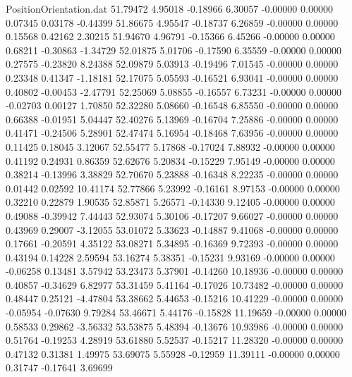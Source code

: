 \begin{filecontents}{PositionOrientation.dat}
  51.79472    4.95018   -0.18966     6.30057   -0.00000    0.00000    0.07345    0.03178   -0.44399
  51.86675    4.95547   -0.18737     6.26859   -0.00000    0.00000    0.15568    0.42162    2.30215
  51.94670    4.96791   -0.15366     6.45266   -0.00000    0.00000    0.68211   -0.30863   -1.34729
  52.01875    5.01706   -0.17590     6.35559   -0.00000    0.00000    0.27575   -0.23820    8.24388
  52.09879    5.03913   -0.19496     7.01545   -0.00000    0.00000    0.23348    0.41347   -1.18181
  52.17075    5.05593   -0.16521     6.93041   -0.00000    0.00000    0.40802   -0.00453   -2.47791
  52.25069    5.08855   -0.16557     6.73231   -0.00000    0.00000   -0.02703    0.00127    1.70850
  52.32280    5.08660   -0.16548     6.85550   -0.00000    0.00000    0.66388   -0.01951    5.04447
  52.40276    5.13969   -0.16704     7.25886   -0.00000    0.00000    0.41471   -0.24506    5.28901
  52.47474    5.16954   -0.18468     7.63956   -0.00000    0.00000    0.11425    0.18045    3.12067
  52.55477    5.17868   -0.17024     7.88932   -0.00000    0.00000    0.41192    0.24931    0.86359
  52.62676    5.20834   -0.15229     7.95149   -0.00000    0.00000    0.38214   -0.13996    3.38829
  52.70670    5.23888   -0.16348     8.22235   -0.00000    0.00000    0.01442    0.02592   10.41174
  52.77866    5.23992   -0.16161     8.97153   -0.00000    0.00000    0.32210    0.22879    1.90535
  52.85871    5.26571   -0.14330     9.12405   -0.00000    0.00000    0.49088   -0.39942    7.44443
  52.93074    5.30106   -0.17207     9.66027   -0.00000    0.00000    0.43969    0.29007   -3.12055
  53.01072    5.33623   -0.14887     9.41068   -0.00000    0.00000    0.17661   -0.20591    4.35122
  53.08271    5.34895   -0.16369     9.72393   -0.00000    0.00000    0.43194    0.14228    2.59594
  53.16274    5.38351   -0.15231     9.93169   -0.00000    0.00000   -0.06258    0.13481    3.57942
  53.23473    5.37901   -0.14260    10.18936   -0.00000    0.00000    0.40857   -0.34629    6.82977
  53.31459    5.41164   -0.17026    10.73482   -0.00000    0.00000    0.48447    0.25121   -4.47804
  53.38662    5.44653   -0.15216    10.41229   -0.00000    0.00000   -0.05954   -0.07630    9.79284
  53.46671    5.44176   -0.15828    11.19659   -0.00000    0.00000    0.58533    0.29862   -3.56332
  53.53875    5.48394   -0.13676    10.93986   -0.00000    0.00000    0.51764   -0.19253    4.28919
  53.61880    5.52537   -0.15217    11.28320   -0.00000    0.00000    0.47132    0.31381    1.49975
  53.69075    5.55928   -0.12959    11.39111   -0.00000    0.00000    0.31747   -0.17641    3.69699

\end{filecontents}
